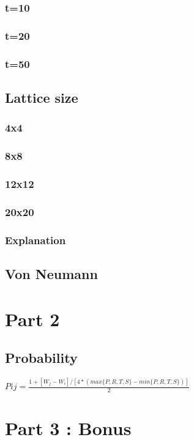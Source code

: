\documentclass[11pt]{article}
\begin{document}
\subsubsection{t=10}

\subsubsection{t=20}

\subsubsection{t=50}

\subsection{Lattice size}

\subsubsection{4x4}

\subsubsection{8x8}

\subsubsection{12x12}

\subsubsection{20x20}

\subsubsection{Explanation}


\subsection{Von Neumann}
 
\section{Part 2}

\subsection{Probability}

$Pij = \frac{1 + [W_j-W_i]/[4*(max\{P,R,T,S\} - min\{P,R,T,S\})]}{2}$ 

\section{Part 3 : Bonus}
\end{document}
